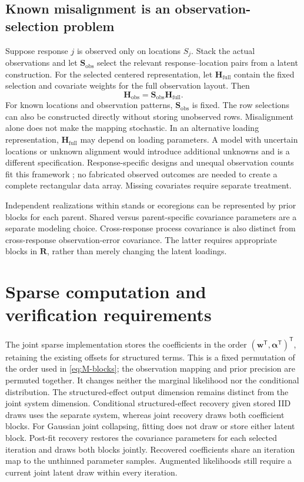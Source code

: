 \documentclass[11pt]{article}
\newcommand{\bw}{\bm{w}}
\newcommand{\balpha}{\bm{\alpha}}
\newcommand{\bH}{\bm{H}}
\newcommand{\bR}{\bm{R}}
\newcommand{\bS}{\bm{S}}
\newcommand{\trans}{^{\mathsf T}}
\begin{document}
\subsection{Known misalignment is an observation-selection problem}
Suppose response $j$ is observed only on locations $S_j$. Stack the actual
observations and let $\bS_{\mathrm{obs}}$ select the relevant response--location
pairs from a latent construction. For the selected centered representation, let
$\bH_{\mathrm{full}}$ contain the fixed selection and covariate weights for
the full observation layout. Then
\begin{equation}\label{eq:misalignment}
 \bH_{\mathrm{obs}}=\bS_{\mathrm{obs}}\bH_{\mathrm{full}}.
\end{equation}
For known locations and observation patterns, $\bS_{\mathrm{obs}}$ is fixed.
The row selections can also be constructed directly without storing unobserved
rows. Misalignment alone does not make the mapping stochastic. In an alternative
loading representation, $\bH_{\mathrm{full}}$ may depend on loading parameters.
A model with uncertain locations or unknown alignment would introduce additional
unknowns and is a different specification.
Response-specific designs and unequal observation counts fit this framework
\cite{Finley2014}; no fabricated observed outcomes are needed to create a complete
rectangular data array. Missing covariates require separate treatment.

Independent realizations within stands or ecoregions can be represented by prior
blocks for each parent. Shared versus parent-specific covariance parameters are
a separate modeling choice. Cross-response process covariance is also distinct
from cross-response observation-error covariance. The latter requires appropriate
blocks in $\bR$, rather than merely changing the latent loadings.

\section{Sparse computation and verification requirements}
The joint sparse implementation stores the coefficients in the order
$(\bw\trans,\balpha\trans)\trans$, retaining the existing offsets for structured
terms. This is a fixed permutation of the order used in \eqref{eq:M-blocks};
the observation mapping and prior precision are permuted together. It changes
neither the marginal likelihood nor the conditional distribution. The
structured-effect output dimension remains distinct from the joint system
dimension. Conditional structured-effect recovery given stored IID draws uses
the separate system, whereas joint recovery draws both coefficient blocks.
For Gaussian joint collapsing, fitting does not draw or store either latent
block. Post-fit recovery restores the covariance parameters for each selected
iteration and draws both blocks jointly. Recovered coefficients share an
iteration map to the unthinned parameter samples. Augmented likelihoods still
require a current joint latent draw within every iteration.
\end{document}

